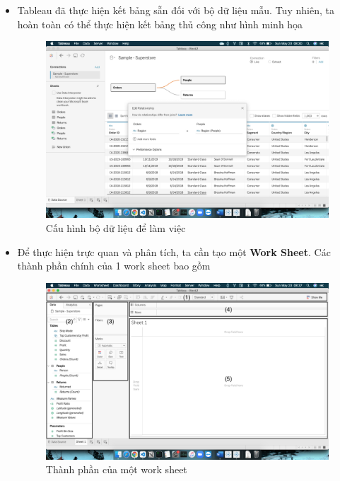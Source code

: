 \documentclass[a4paper, 12pt]{article}
\begin{document}
\begin{itemize}
    \item Tableau đã thực hiện kết bảng sẵn đối với bộ dữ liệu mẫu. Tuy nhiên, ta hoàn toàn có thể thực hiện kết bảng thủ công như hình minh họa
    \begin{figure}[H]
        \begin{center}
            \includegraphics[scale=0.3]{img/joinTable.png}
            \caption{Cấu hình bộ dữ liệu để làm việc}
        \end{center}
    \end{figure}

    \item Để thực hiện trực quan và phân tích, ta cần tạo một \textbf{Work Sheet}. Các thành phần chính của 1 work sheet bao gồm
    \begin{figure}[H]
        \begin{center}
            \includegraphics[scale=0.3]{img/newSheet.png}
            \caption{Thành phần của một work sheet}
        \end{center}
    \end{figure}


\end{itemize}
\end{document}
